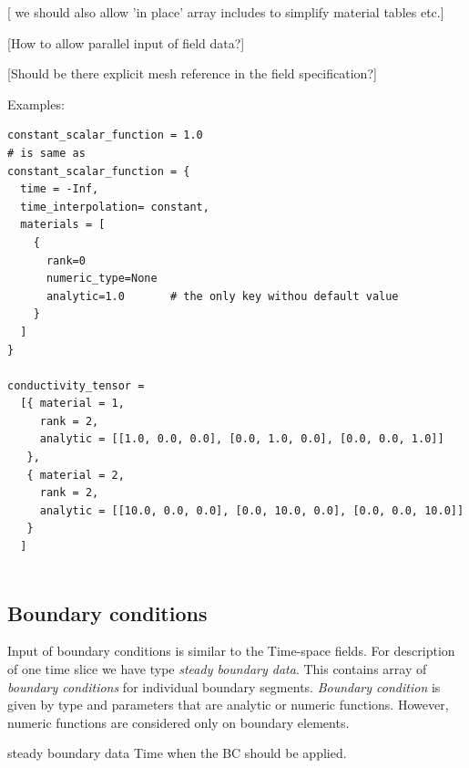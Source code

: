 \documentclass[12pt,a4paper]{report}
\begin{document}
[ we should also allow 'in place' array includes to simplify material tables etc.]

[How to allow parallel input of field data?]

[Should be there explicit mesh reference in the field specification?]


Examples:
\begin{verbatim}
constant_scalar_function = 1.0
# is same as
constant_scalar_function = {
  time = -Inf,
  time_interpolation= constant,
  materials = [
    {
      rank=0
      numeric_type=None
      analytic=1.0       # the only key withou default value
    }
  ]
}

conductivity_tensor = 
  [{ material = 1,
     rank = 2,
     analytic = [[1.0, 0.0, 0.0], [0.0, 1.0, 0.0], [0.0, 0.0, 1.0]]
   },
   { material = 2,
     rank = 2,
     analytic = [[10.0, 0.0, 0.0], [0.0, 10.0, 0.0], [0.0, 0.0, 10.0]]
   }
  ]
 
\end{verbatim}

\subsection{Boundary conditions}
Input of boundary conditions is similar to the Time-space fields. For description of one time slice we have 
type {\it steady boundary data}. This contains array of {\it boundary conditions} for individual boundary segments. 
{\it Boundary condition} is given by type and parameters that are analytic or numeric functions. However, numeric functions
are considered only on boundary elements.

\begin{recordtype}{steady boundary data}{}
Time when the BC should be applied.
\end{recordtype}
\end{document}
